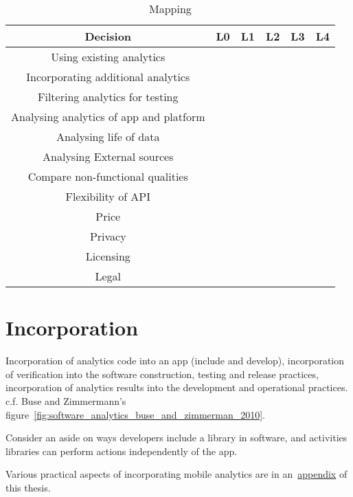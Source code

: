 \begin{table}\begin{tabular}{|c|c|c|c|c|c|}\hline
Decision & L0 & L1 & L2 & L3 & L4 \\\hline
Using existing analytics &  &  &  &  & \\
Incorporating additional analytics & & & & & \\ 
Filtering analytics for testing & & & & & \\
Analysing analytics of app and platform & & & & & \\ 
Analysing life of data  & & & & & \\
Analysing External sources & & & & & \\\hline
Compare non-functional qualities & & & & & \\
Flexibility of API & & & & & \\
Price & & & & & \\
Privacy & & & & & \\
Licensing & & & & & \\
Legal & & & & & \\\hline
\end{tabular}\caption{Mapping}\label{tab:my_label}
\end{table}

\section{Incorporation}
Incorporation of analytics code into an app (include and develop), incorporation of verification into the software construction, testing and release practices, incorporation of analytics results into the development and operational practices. c.f. Buse and Zimmermann's figure~\ref{fig:software_analytics_buse_and_zimmerman_2010}.

Consider an aside on ways developers include a library in software, and activities libraries can perform actions independently of the app. 

Various practical aspects of incorporating mobile analytics are in an~\href{practical-aspects-appendix}{appendix} of this thesis.  


